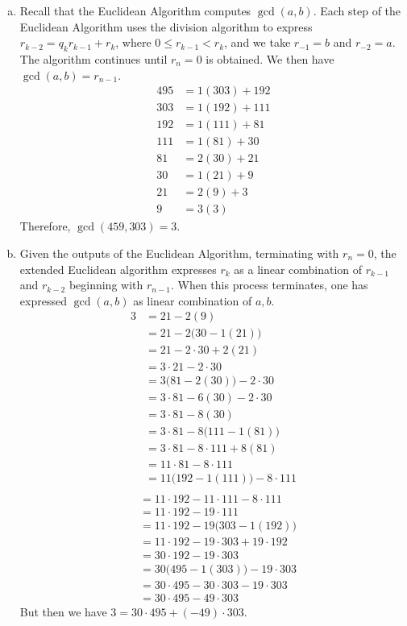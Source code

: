 \documentclass[11pt,letterpaper]{article}
\begin{document}
\sol 
\begin{enumerate}[(a)]
\item Recall that the Euclidean Algorithm computes $\gcd(a, b)$. Each step of the Euclidean Algorithm uses the division algorithm to express $r_{k-2}= q_k r_{k-1} + r_k$, where $0 \leq r_{k-1} < r_k$, and we take $r_{-1}= b$ and $r_{-2}= a$. The algorithm continues until $r_n= 0$ is obtained. We then have $\gcd(a, b)= r_{n-1}$. 
	\[
	\begin{aligned}
	495&= 1(303) + 192 \\
	303&= 1(192) + 111 \\
	192&= 1(111) + 81 \\
	111&= 1(81) + 30 \\
	81&= 2(30) + 21 \\
	30&= 1(21) + 9 \\
	21&= 2(9) + 3 \\
	9&= 3(3)
	\end{aligned}
	\]
Therefore, $\gcd(459, 303)= 3$. \pspace

\item Given the outputs of the Euclidean Algorithm, terminating with $r_n= 0$, the extended Euclidean algorithm expresses $r_k$ as a linear combination of $r_{k-1}$ and $r_{k-2}$ beginning with $r_{n-1}$. When this process terminates, one has expressed $\gcd(a, b)$ as linear combination of $a, b$. 
	\[
	\begin{aligned}
	3&= 21 - 2(9) \\
	&= 21 - 2 \big(30 - 1(21) \big) \\
	&= 21 - 2 \cdot 30 + 2(21) \\
	&= 3 \cdot 21 - 2 \cdot 30 \\
	&= 3 \big(81 - 2(30) \big) - 2 \cdot 30 \\
	&= 3 \cdot 81 - 6(30) - 2 \cdot 30 \\
	&= 3 \cdot 81 - 8(30) \\
	&= 3 \cdot 81 - 8 \big(111 - 1(81) \big) \\
	&= 3 \cdot 81 - 8 \cdot 111 + 8(81) \\
	&= 11 \cdot 81 - 8 \cdot 111 \\
	&= 11 \big(192 - 1(111) \big) - 8 \cdot 111 \\
	\end{aligned}
	\]
	\[
	\begin{aligned}
	&= 11 \cdot 192 - 11 \cdot 111 - 8 \cdot 111 \\
	&= 11 \cdot 192 - 19 \cdot 111 \\
	&= 11 \cdot 192 - 19 \big(303 - 1(192) \big) \\
	&= 11 \cdot 192 - 19 \cdot 303 + 19 \cdot 192 \\
	&= 30 \cdot 192 - 19 \cdot 303 \\
	&= 30 \big(495 - 1(303) \big) - 19 \cdot 303 \\
	&= 30 \cdot 495 - 30 \cdot 303 - 19 \cdot 303 \\
	&= 30 \cdot 495 - 49 \cdot 303
	\end{aligned}
	\]
But then we have $3= 30 \cdot 495 + (-49) \cdot 303$. \pspace


\end{enumerate}
\end{document}
